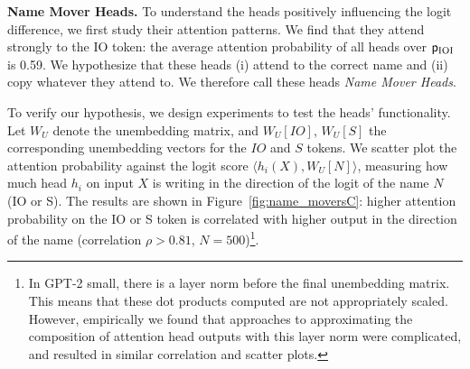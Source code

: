 
\textbf{Name Mover Heads.} To understand the heads positively influencing the logit difference, we first study their attention patterns. We find that they attend strongly to the IO token: the average attention probability of all heads over $\mathsf{p}_{\mathrm{IOI}}$ is 0.59. We hypothesize that these heads (i) attend to the correct name and (ii) copy whatever they attend to. We therefore call these heads \emph{Name Mover Heads}. 


To verify our hypothesis, we design experiments to test the heads' functionality.
Let $W_U$ denote the unembedding matrix, and $W_U[IO]$, $W_U[S]$ the corresponding unembedding vectors for the $IO$ and $S$ tokens. We scatter plot the attention probability against the logit score $\langle h_i(X), W_U[N]  \rangle$, measuring how much head $h_i$ on input $X$ is writing in the direction of the logit of the name $N$ (IO or S). The results are shown in Figure~\ref{fig:name_moversC}: higher attention probability on the IO or S token is correlated with higher output in the direction of the name (correlation $\rho>0.81$, $N=500$)\footnote{In GPT-2 small, there is a layer norm before the final unembedding matrix. This means that these dot products computed are not appropriately scaled. However, empirically we found that approaches to approximating the composition of attention head outputs with this layer norm were complicated, and resulted in similar correlation and scatter plots.}. 

